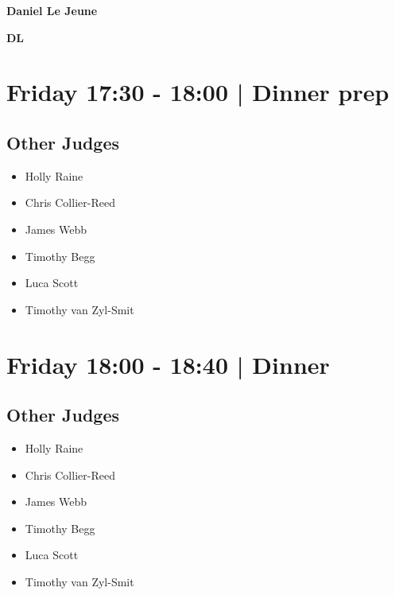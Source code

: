 \documentclass[10pt, A5]{article}
\newcommand{\newtitle}[1]{\begin{center}{\Huge\bfseries #1 }\\ \vspace{5mm}\end{center}}
\newcommand{\newsubtitle}[1]{\begin{center}{\color{grey}\Large\bfseries #1 }\\ \vspace{5mm}\end{center}}
\begin{document}
		\newtitle{Daniel Le Jeune}
	\newsubtitle{DL}

            \section*{Friday 17:30
        -
        18:00
        |
         Dinner prep}
        
                
        \subsection*{Other Judges}
        
            \begin{itemize}
                            \item Holly Raine
                            \item Chris Collier-Reed
                            \item James Webb
                            \item Timothy Begg
                            \item Luca Scott
                            \item Timothy van Zyl-Smit
                        \end{itemize}
        

            \section*{Friday 18:00
        -
        18:40
        |
         Dinner }
        
                
        \subsection*{Other Judges}
        
            \begin{itemize}
                            \item Holly Raine
                            \item Chris Collier-Reed
                            \item James Webb
                            \item Timothy Begg
                            \item Luca Scott
                            \item Timothy van Zyl-Smit
                        \end{itemize}
        
\end{document}
